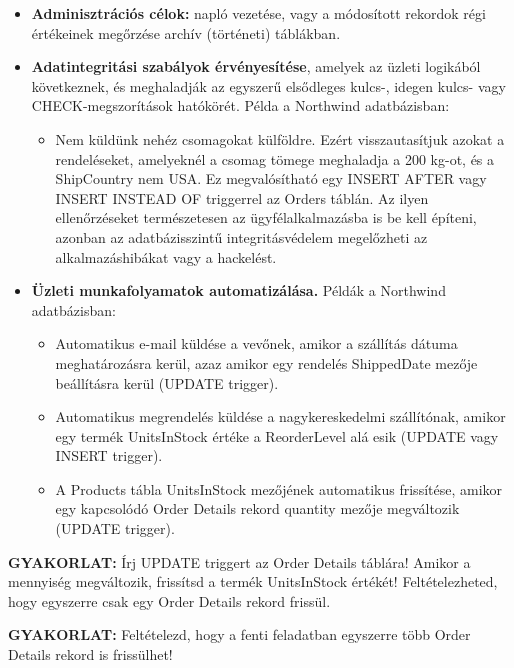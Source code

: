 \documentclass[
  magyar,
]{article}
\providecommand{\tightlist}{%
  \setlength{\itemsep}{0pt}\setlength{\parskip}{0pt}}
\begin{document}
\begin{itemize}
\tightlist
\item
  \textbf{Adminisztrációs célok:} napló vezetése, vagy a módosított
  rekordok régi értékeinek megőrzése archív (történeti) táblákban.
\item
  \textbf{Adatintegritási szabályok érvényesítése}, amelyek az üzleti
  logikából következnek, és meghaladják az egyszerű elsődleges kulcs-,
  idegen kulcs- vagy CHECK-megszorítások hatókörét. Példa a Northwind
  adatbázisban:

  \begin{itemize}
  \tightlist
  \item
    Nem küldünk nehéz csomagokat külföldre. Ezért visszautasítjuk azokat
    a rendeléseket, amelyeknél a csomag tömege meghaladja a 200 kg-ot,
    és a ShipCountry nem USA. Ez megvalósítható egy INSERT AFTER vagy
    INSERT INSTEAD OF triggerrel az Orders táblán. Az ilyen
    ellenőrzéseket természetesen az ügyfélalkalmazásba is be kell
    építeni, azonban az adatbázisszintű integritásvédelem megelőzheti az
    alkalmazáshibákat vagy a hackelést.
  \end{itemize}
\item
  \textbf{Üzleti munkafolyamatok automatizálása.} Példák a Northwind
  adatbázisban:

  \begin{itemize}
  \tightlist
  \item
    Automatikus e-mail küldése a vevőnek, amikor a szállítás dátuma
    meghatározásra kerül, azaz amikor egy rendelés ShippedDate mezője
    beállításra kerül (UPDATE trigger).
  \item
    Automatikus megrendelés küldése a nagykereskedelmi szállítónak,
    amikor egy termék UnitsInStock értéke a ReorderLevel alá esik
    (UPDATE vagy INSERT trigger).
  \item
    A Products tábla UnitsInStock mezőjének automatikus frissítése,
    amikor egy kapcsolódó Order Details rekord quantity mezője
    megváltozik (UPDATE trigger).
  \end{itemize}
\end{itemize}

\textbf{GYAKORLAT:} Írj UPDATE triggert az Order Details táblára! Amikor
a mennyiség megváltozik, frissítsd a termék UnitsInStock értékét!
Feltételezheted, hogy egyszerre csak egy Order Details rekord frissül.

\textbf{GYAKORLAT:} Feltételezd, hogy a fenti feladatban egyszerre több
Order Details rekord is frissülhet!
\end{document}
